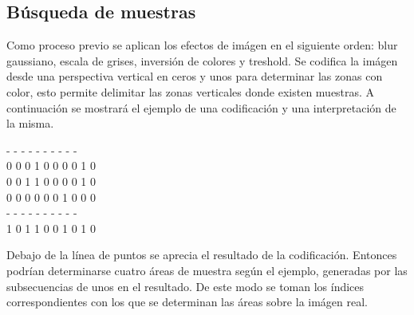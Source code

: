 \subsection{B\'usqueda de muestras}
Como proceso previo se aplican los efectos de im\'agen en el siguiente orden: blur gaussiano, escala de grises, inversi\'on de colores y treshold. Se codifica la im\'agen desde una perspectiva vertical en ceros y unos para determinar las zonas con color, esto permite delimitar las zonas verticales donde existen muestras. A continuaci\'on se mostrar\'a el ejemplo de una codificaci\'on y una interpretaci\'on de la misma.
\newpage
\begin{center}
- - - - - - - - - -\\
0 0 0 1 0 0 0 0 1 0\\
0 0 1 1 0 0 0 0 1 0\\
0 0 0 0 0 0 1 0 0 0\\
- - - - - - - - - -\\
1 0 1 1 0 0 1 0 1 0\\
\end{center}

Debajo de la l\'inea de puntos se aprecia el resultado de la codificaci\'on. Entonces podr\'ian determinarse cuatro \'areas de muestra seg\'un el ejemplo, generadas por las subsecuencias de unos en el resultado. De este modo se toman los \'indices correspondientes con los que se determinan las \'areas sobre la im\'agen real. 



